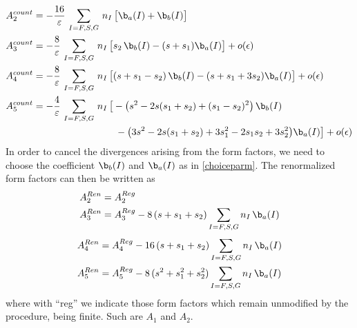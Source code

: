 \documentclass[a4paper,11pt,openright,twoside]{book}
\numberwithin{equation}{section}
\begin{document}
{{\begin{align}
	A_2^{count}&=-\frac{16}{\varepsilon}\,\sum_{I=F,S,G}\,n_I\,\big[\b_a(I)+\b_b(I)\big]\notag\\
	A_3^{count}&=-\frac{8}{\varepsilon}\,\sum_{I=F,S,G}\,n_I\,\big[s_2\,\b_b(I)-(s+s_1)\b_a(I)\big]+o(\epsilon)\notag\\
	A_4^{count}&=-\frac{8}{\varepsilon}\,\sum_{I=F,S,G}\,n_I\,\big[(s+s_1-s_2)\,\b_b(I)-(s+s_1+3s_2)\b_a(I)\big]+o(\epsilon)\notag\\
	A_5^{count}&=-\frac{4}{\varepsilon}\,\sum_{I=F,S,G}\,n_I\,\big[-\big(s^2-2s(s_1+s_2)+(s_1-s_2)^2\big)\,\b_b(I)\notag\\
	&\hspace{3cm}-\big(3s^2-2s(s_1+s_2)+3s_1^2-2s_1s_2+3s_2^2\big)\b_a(I)\big]+o(\epsilon)
\end{align}
In order to cancel the divergences arising from the form factors, we need to choose the coefficient $\b_b(I)$ and $\b_a(I)$ as in \eqref{choiceparm}. The renormalized form factors can then be written as
\begin{align}
	A_2^{Ren}&=A_2^{Reg}\\
	A_3^{Ren}&=A_3^{Reg}-8\,(s+s_1+s_2)\sum_{I=F,S,G}n_I\,\b_a(I)
\end{align}
\begin{align}
	A_4^{Ren}&=A_4^{Reg}-16\,(s+s_1+s_2)\sum_{I=F,S,G}n_I\,\b_a(I)\\
	A_5^{Ren}&=A_5^{Reg}-8\,(s^2+s_1^2+s_2^2)\sum_{I=F,S,G}n_I\,\b_a(I)
\end{align}
where with ``reg'' we indicate those form factors which remain unmodified by the procedure, being finite. Such are $A_1$ and $A_2$.
}}
\end{document}

